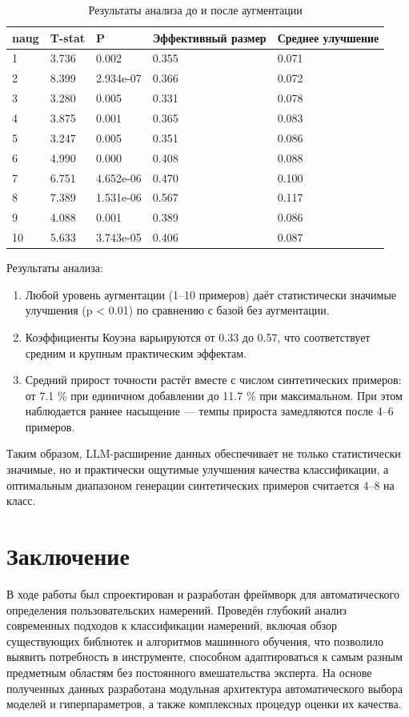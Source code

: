 \documentclass[14pt,a4paper,oneside,openany]{extbook}
\begin{document}
\begin{table}[h!]
\caption{\label{tbl:augmented_models_performance}Результаты анализа до и после аугментации}
\centering
\begin{tabular}{|p{1cm}|p{1.5cm}|p{1.5cm}|p{1.5cm}|p{2.5cm}|}
\hline
naug & T-stat & P & Эффективный размер & Среднее улучшение\\
\hline
1 & 3.736 & 0.002 & 0.355 & 0.071\\
\hline
2 & 8.399 & 2.934e-07 & 0.366 & 0.072\\
\hline
3 & 3.280 & 0.005 & 0.331 & 0.078\\
\hline
4 & 3.875 & 0.001 & 0.365 & 0.083\\
\hline
5 & 3.247 & 0.005 & 0.351 & 0.086\\
\hline
6 & 4.990 & 0.000 & 0.408 & 0.088\\
\hline
7 & 6.751 & 4.652e-06 & 0.470 & 0.100\\
\hline
8 & 7.389 & 1.531e-06 & 0.567 & 0.117\\
\hline
9 & 4.088 & 0.001 & 0.389 & 0.086\\
\hline
10 & 5.633 & 3.743e-05 & 0.406 & 0.087\\
\hline
\end{tabular}
\end{table}
Результаты анализа:
\begin{enumerate}
\item Любой уровень аугментации (1–10 примеров) даёт статистически значимые улучшения (p < 0.01) по сравнению с базой без аугментации.
\item Коэффициенты Коуэна варьируются от 0.33 до 0.57, что соответствует средним и крупным практическим эффектам.
\item Средний прирост точности растёт вместе с числом синтетических примеров: от 7.1 \% при единичном добавлении до 11.7 \% при максимальном. При этом наблюдается раннее насыщение — темпы прироста замедляются после 4–6 примеров.
\end{enumerate}

Таким образом, LLM-расширение данных обеспечивает не только статистически значимые, но и практически ощутимые улучшения качества классификации, а оптимальным диапазоном генерации синтетических примеров считается 4–8 на класс.
\chapter*{Заключение}
\label{sec:org8e735e7}
В ходе работы был спроектирован и разработан фреймворк для автоматического определения пользовательских намерений. Проведён глубокий анализ современных подходов к классификации намерений, включая обзор существующих библиотек и алгоритмов машинного обучения, что позволило выявить потребность в инструменте, способном адаптироваться к самым разным предметным областям без постоянного вмешательства эксперта. На основе полученных данных разработана модульная архитектура автоматического выбора моделей и гиперпараметров, а также комплексных процедур оценки их качества.
\end{document}
